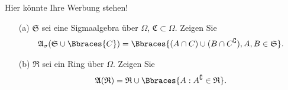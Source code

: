 \begin{exercise}

Hier könnte Ihre Werbung stehen!

\begin{itemize}
  \item[(a)] $\mathfrak{S}$ sei eine Sigmaalgebra über $\Omega$, $\mathfrak{C} \subset \Omega$. Zeigen Sie
  \begin{align*}
    \mathfrak{A}_\sigma(\mathfrak{S} \cup \Bbraces{C}) =
    \Bbraces{(A \cap C) \cup (B \cap C^\complement), A, B \in \mathfrak{S}}.
  \end{align*}
  \item[(b)] $\mathfrak{R}$ sei ein Ring über $\Omega$. Zeigen Sie
  \begin{align*}
    \mathfrak{A}(\mathfrak{R}) =
    \mathfrak{R} \cup \Bbraces{A: A^\complement \in \mathfrak{R}}.
  \end{align*}
\end{itemize}

\end{exercise}


